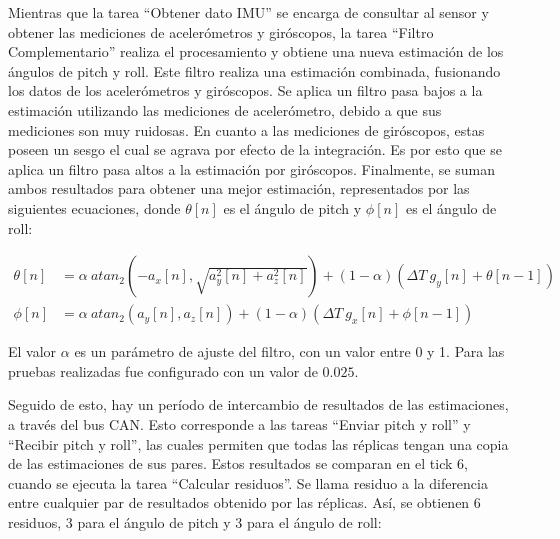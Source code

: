 

Mientras que la tarea ``Obtener dato IMU'' se encarga de consultar al sensor y obtener las mediciones de acelerómetros y giróscopos, la tarea ``Filtro Complementario'' realiza el procesamiento y obtiene una nueva estimación de los ángulos de pitch y roll. Este filtro realiza una estimación combinada, fusionando los datos de los acelerómetros y giróscopos. Se aplica un filtro pasa bajos a la estimación utilizando las mediciones de acelerómetro, debido a que sus mediciones son muy ruidosas. En cuanto a las mediciones de giróscopos, estas poseen un sesgo el cual se agrava por efecto de la integración. Es por esto que se aplica un filtro pasa altos a la estimación por giróscopos. Finalmente, se suman ambos resultados para obtener una mejor estimación, representados por las siguientes ecuaciones, donde $\theta[n]$ es el ángulo de pitch y $\phi[n]$ es el ángulo de roll:

\begin{subequations}
    \begin{align}
        \theta[n] &= \alpha \ atan_2(-a_x[n], \sqrt{a_y^2[n]+a_z^2[n]}) + (1 - \alpha) \left( \Delta T \ g_y[n] + \theta[n-1] \right)\\
        \phi[n] &= \alpha \ atan_2(a_y[n], a_z[n]) + (1 - \alpha) \left( \Delta T \ g_x[n] + \phi [n-1] \right)
    \end{align}
\end{subequations}

El valor $\alpha$ es un parámetro de ajuste del filtro, con un valor entre 0 y 1. Para las pruebas realizadas fue configurado con un valor de $0.025$.

Seguido de esto, hay un período de intercambio de resultados de las estimaciones, a través del bus CAN. Esto corresponde a las tareas ``Enviar pitch y roll'' y ``Recibir pitch y roll'', las cuales permiten que todas las réplicas tengan una copia de las estimaciones de sus pares. Estos resultados se comparan en el tick 6, cuando se ejecuta la tarea ``Calcular residuos''. Se llama residuo a la diferencia entre cualquier par de resultados obtenido por las réplicas. Así, se obtienen 6 residuos, 3 para el ángulo de pitch y 3 para el ángulo de roll:

